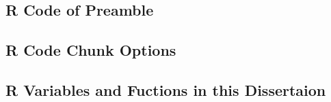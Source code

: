 \documentclass[a4paper,12pt,times,numbered,print,index]{Classes/PhDThesisPSnPDF}
\begin{document}

\begin{appendices} %
\chapter{R Code of Preamble}
\section{R Code Chunk Options}
\section{R Variables and Fuctions in this Dissertaion}
\end{appendices}



\printthesisindex %
\end{document}
